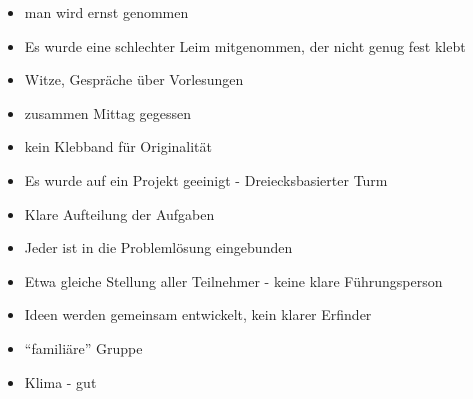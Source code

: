 \documentclass[notitlepage,notoc,noindex,notodo]{wmnotes}
\begin{document}
\begin{itemize}
	\item man wird ernst genommen
	\item Es wurde eine schlechter Leim mitgenommen, der nicht genug fest klebt
	\item Witze, Gespräche über Vorlesungen
	\item zusammen Mittag gegessen
	\item kein Klebband für Originalität
	\item Es wurde auf ein Projekt geeinigt - Dreiecksbasierter Turm
	\item Klare Aufteilung der Aufgaben
	\item Jeder ist in die Problemlösung eingebunden
	\item Etwa gleiche Stellung aller Teilnehmer - keine klare Führungsperson
	\item Ideen werden gemeinsam entwickelt, kein klarer Erfinder
	\item \enquote{familiäre} Gruppe
	\item Klima - gut
\end{itemize}
\end{document}
